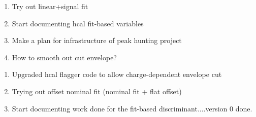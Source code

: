 

\begin{enumerate}
\item Try out linear+signal fit
\item Start documenting hcal fit-based variables
\item Make a plan for infrastructure of peak hunting project
\item How to smooth out cut envelope?
\end{enumerate}


\begin{enumerate}
\item Upgraded hcal flagger code to allow charge-dependent envelope cut
\item Trying out offset nominal fit (nominal fit + flat offset)
\item Start documenting work done for the fit-based discriminant....version 0 done.
\end{enumerate}

